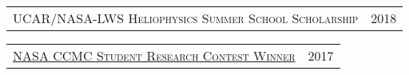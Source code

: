 \documentclass[10pt]{article}
\begin{document}
{{%

\smallskip
\begin{tabular}{p{15.75cm} p{3.25cm}}
\textsc{\normalsize{UCAR/NASA-LWS Heliophysics Summer School Scholarship}} & \normalsize{2018} %
\end{tabular}

\begin{tabular}{p{15.75cm} p{3.25cm}}
\href{https://ccmc.gsfc.nasa.gov/support/contest-2017/contestresults.php}{\textsc{\normalsize{NASA CCMC Student Research Contest Winner}}} & \normalsize{2017} %
\end{tabular}




}}
\end{document}

